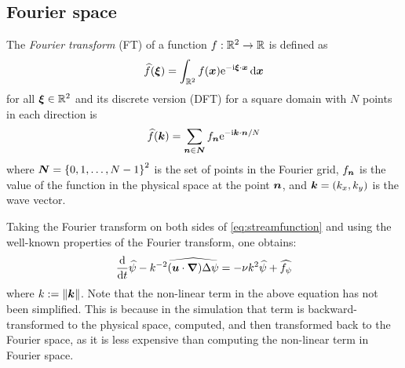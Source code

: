 \documentclass[../main.tex]{subfiles}
\begin{document}
\subsection{Fourier space}
The \emph{Fourier transform} (FT) of a function $f:\mathbb{R}^2 \to \mathbb{R}$ is defined as
\begin{equation}
	\widehat{f}(\boldsymbol{\xi}) = \int_{\mathbb{R}^2} f(\boldsymbol{x}) \mathrm{e}^{-\mathrm{i} \boldsymbol{\xi} \cdot \boldsymbol{x}} \dd{\boldsymbol{x}}
\end{equation}
for all $\boldsymbol{\xi}\in\mathbb{R}^2$ and its discrete version (DFT) for a square domain with $N$ points in each direction is
\begin{equation}
	\widehat{f}(\boldsymbol{k}) = \sum_{\boldsymbol{n}\in\boldsymbol{N}} f_{\boldsymbol{n}} \mathrm{e}^{-\mathrm{i} \boldsymbol{k} \cdot \boldsymbol{n} / N}
\end{equation}
where $\boldsymbol{N} = {\{0,1,\ldots,N-1\}}^2$ is the set of points in the Fourier grid, $f_{\boldsymbol{n}}$ is the value of the function in the physical space at the point $\boldsymbol{n}$, and $\boldsymbol{k} = (k_x,k_y)$ is the wave vector.

Taking the Fourier transform on both sides of \cref{eq:streamfunction} and using the well-known properties of the Fourier transform, one obtains:
\begin{equation}\label{eq:streamfunction_fourier}
	\dv{}{t}\widehat{\psi} - k^{-2} \widehat{(\boldsymbol{u}\cdot \grad) \Delta \psi}= -\nu k^2 \widehat{\psi} + \widehat{f_\psi}
\end{equation}
where $k:=\left\|\boldsymbol{k}\right\|$. Note that the non-linear term in the above equation has not been simplified. This is because in the simulation that term is backward-transformed to the physical space, computed, and then transformed back to the Fourier space, as it is less expensive than computing the non-linear term in Fourier space.
\end{document}
